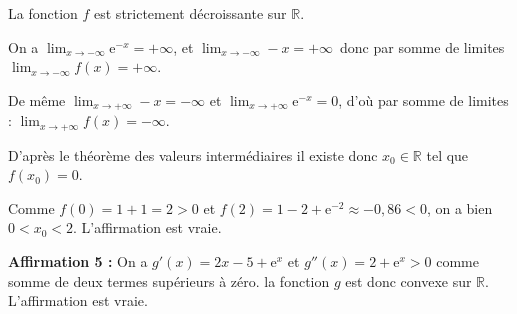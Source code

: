 \documentclass[10pt]{article}
\providecommand{\R}{\mathbb{R}}
\begin{document}
La fonction $f$ est strictement décroissante sur $\R$.



On a $\displaystyle\lim_{x \to - \infty} \text{e}^{-x} = + \infty$, et $\displaystyle\lim_{x \to - \infty} - x = + \infty$\, donc par somme de limites  $\displaystyle\lim_{x \to - \infty} f(x) = + \infty$.

De même $\displaystyle\lim_{x \to + \infty} - x = - \infty$ et $\displaystyle\lim_{x \to + \infty} \text{e}^{- x} = 0$, d'où par somme de limites : $\displaystyle\lim_{x \to + \infty} f(x) = - \infty$.

D'après le théorème des valeurs intermédiaires il existe donc $x_0 \in \R$ tel que $f\left(x_0\right) = 0$.

Comme $f(0) = 1 + 1 = 2 > 0$ et $f(2) = 1 - 2 + \text{e}^{-2} \approx - 0,86 < 0$, on a bien $0 < x_0 < 2$. L'affirmation est vraie.
\smallskip

\textbf{Affirmation 5 :} 
On a $g'(x) = 2x - 5 + \text{e}^x$ et $g''(x) = 2 + \text{e}^x > 0$ comme somme de deux termes supérieurs à zéro. la fonction $g$ est donc convexe sur $\R$. L'affirmation est vraie.

\bigskip
\end{document}

